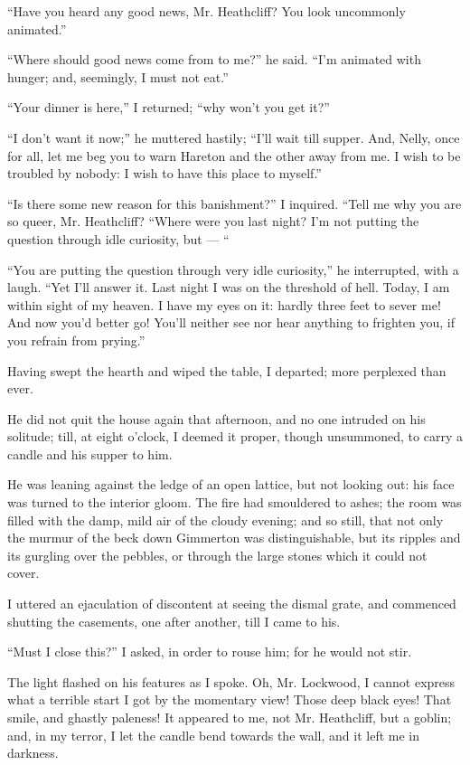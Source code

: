 \par “Have you heard any good news, Mr. Heathcliff? You look uncommonly animated.”
\par “Where should good news come from to me?” he said. “I'm animated with hunger; and, seemingly, I must not eat.”
\par “Your dinner is here,” I returned; “why won't you get it?”
\par “I don't want it now;” he muttered hastily; “I'll wait till supper. And, Nelly, once for all, let me beg you to warn Hareton and the other away from me. I wish to be troubled by nobody: I wish to have this place to myself.”
\par “Is there some new reason for this banishment?” I inquired. “Tell me why you are so queer, Mr. Heathcliff? “Where were you last night? I'm not putting the question through idle curiosity, but — “
\par “You are putting the question through very idle curiosity,” he interrupted, with a laugh. “Yet I'll answer it. Last night I was on the threshold of hell. Today, I am within sight of my heaven. I have my eyes on it: hardly three feet to sever me! And now you'd better go! You'll neither see nor hear anything to frighten you, if you refrain from prying.”
\par Having swept the hearth and wiped the table, I departed; more perplexed than ever.
\par He did not quit the house again that afternoon, and no one intruded on his solitude; till, at eight o'clock, I deemed it proper, though unsummoned, to carry a candle and his supper to him.
\par He was leaning against the ledge of an open lattice, but not looking out: his face was turned to the interior gloom. The fire had smouldered to ashes; the room was filled with the damp, mild air of the cloudy evening; and so still, that not only the murmur of the beck down Gimmerton was distinguishable, but its ripples and its gurgling over the pebbles, or through the large stones which it could not cover.
\par I uttered an ejaculation of discontent at seeing the dismal grate, and commenced shutting the casements, one after another, till I came to his.
\par “Must I close this?” I asked, in order to rouse him; for he would not stir.
\par The light flashed on his features as I spoke. Oh, Mr. Lockwood, I cannot express what a terrible start I got by the momentary view! Those deep black eyes! That smile, and ghastly paleness! It appeared to me, not Mr. Heathcliff, but a goblin; and, in my terror, I let the candle bend towards the wall, and it left me in darkness.
